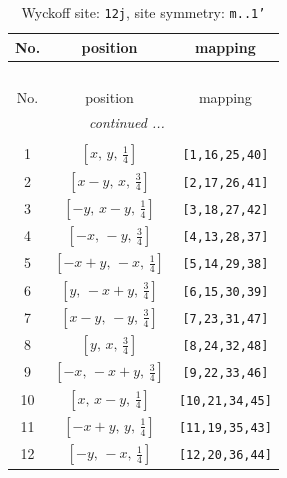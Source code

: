 \documentclass[fleqn,8pt]{jsarticle}
\begin{document}
\begin{longtable}{ccc}
\caption{Wyckoff site: {\tt 12j}, site symmetry: {\tt m..1'}}
 \\
 \hline \hline
No. & position & mapping \\ \hline \endfirsthead

\multicolumn{2}{l}{\tablename\ \thetable{}} \\
 \hline \hline
No. & position & mapping \\ \hline \endhead

 \hline \hline
\multicolumn{2}{r}{\footnotesize\it continued ...} \\ \endfoot

 \hline \hline
\multicolumn{2}{r}{} \\ \endlastfoot

1 & $\left[ x,\, y,\, \frac{1}{4} \right]$ & {\tt [1,16,25,40]} \\ \hline
2 & $\left[ x - y,\, x,\, \frac{3}{4} \right]$ & {\tt [2,17,26,41]} \\ \hline
3 & $\left[ - y,\, x - y,\, \frac{1}{4} \right]$ & {\tt [3,18,27,42]} \\ \hline
4 & $\left[ - x,\, - y,\, \frac{3}{4} \right]$ & {\tt [4,13,28,37]} \\ \hline
5 & $\left[ - x + y,\, - x,\, \frac{1}{4} \right]$ & {\tt [5,14,29,38]} \\ \hline
6 & $\left[ y,\, - x + y,\, \frac{3}{4} \right]$ & {\tt [6,15,30,39]} \\ \hline
7 & $\left[ x - y,\, - y,\, \frac{3}{4} \right]$ & {\tt [7,23,31,47]} \\ \hline
8 & $\left[ y,\, x,\, \frac{3}{4} \right]$ & {\tt [8,24,32,48]} \\ \hline
9 & $\left[ - x,\, - x + y,\, \frac{3}{4} \right]$ & {\tt [9,22,33,46]} \\ \hline
10 & $\left[ x,\, x - y,\, \frac{1}{4} \right]$ & {\tt [10,21,34,45]} \\ \hline
11 & $\left[ - x + y,\, y,\, \frac{1}{4} \right]$ & {\tt [11,19,35,43]} \\ \hline
12 & $\left[ - y,\, - x,\, \frac{1}{4} \right]$ & {\tt [12,20,36,44]} \\
\end{longtable}
\renewcommand{\arraystretch}{1.2}
\end{document}
